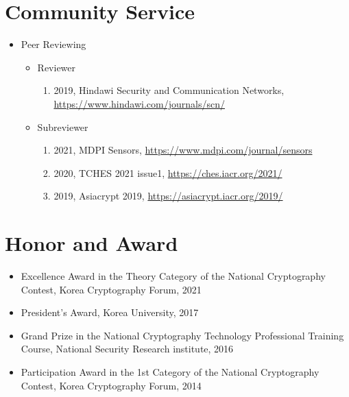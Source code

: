 \documentclass[a4paper,20pt]{article}
\begin{document}
\section{\textbf{Community Service}}
\begin{itemize}
    \item {Peer Reviewing}
        \vspace{-6pt}
        \begin{itemize}
            \item {Reviewer}
                \vspace{-4pt}
                \begin{enumerate}
                    \item {2019, Hindawi Security and Communication Networks, \url{https://www.hindawi.com/journals/scn/}}
                \end{enumerate}
            \item {Subreviewer}
                \vspace{-4pt}
                \begin{enumerate}
                    \item {2021, MDPI Sensors, \url{https://www.mdpi.com/journal/sensors}}
                    \vspace{-2pt}
                    \item {2020, TCHES 2021 issue1, \url{https://ches.iacr.org/2021/}}
                    \vspace{-2pt}
                    \item {2019, Asiacrypt 2019, \url{https://asiacrypt.iacr.org/2019/}}
                \end{enumerate}
        \end{itemize}
\end{itemize}



\section{\textbf{Honor and Award}}
    \begin{itemize}
        \item {Excellence Award in the Theory Category of the National Cryptography Contest, Korea Cryptography Forum, 2021}
        \vspace{-4pt}
        \item {President's Award, Korea University, 2017}
        \vspace{-4pt}
        \item {Grand Prize in the National Cryptography Technology Professional Training Course, National Security Research institute, 2016}
        \vspace{-4pt}
        \item {Participation Award in the 1st Category of the National Cryptography Contest, Korea Cryptography Forum, 2014}
\end{itemize}
\end{document}
